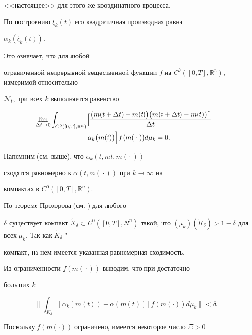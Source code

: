 <<настоящее>> для этого же координатного процесса.



По построению $\xi_k(t)$ его  квадратичная  производная  равна

$\alpha_k(\xi_k(t))$. 

Это означает,  что  для  любой 

ограниченной  непрерывной  вещественной  функции  $f$  на  $C^0([0,T],\mathbb{R}^n)$, измеримой  относительно 

$\mathcal{N}_t$,  при  всех  $k$  выполняется  равенство 

\begin{multline}

\lim\limits_{\Delta t\to 0}\int_{C^0([0,T],\mathbb{R}^n)}

\Bigl[{\frac{ \bigl(m(t+\Delta t)-m(t)\bigr) \bigl(m(t+\Delta t)-m(t)\bigr)^*}{\Delta t}}-

\\

-\alpha_k\bigl(m(t)\bigr)\Bigr]f\bigl(m({}\cdot{})\bigr)d\mu_k=0.

\end{multline}

Напомним (см. выше), что  $\alpha_k(t,mt,m({}\cdot{}))$ 

сходятся равномерно к $\alpha(t,m({}\cdot{}))$ при $k\to\infty$ на

компактах в $C^0([0,T],\mathbb{R}^n)$.



По теореме Прохорова (см. \cite{popovkoval:bib:B}) для любого

$\delta$ существует компакт $\tilde K_\delta\subset

C^0([0,T],\mathcal{R}^n)$ такой, что $(\mu_k)(\tilde

K_\delta)>1-\delta$ для всех $\mu_k$. Так как $\tilde K_\delta$ "---

компакт,  на нем имеется указанная равномерная сходимость.



Из ограниченности $f(m({}\cdot{}))$ выводим, что при достаточно

больших $k$

$$

       \|\int_{\tilde

       K_\delta}[\alpha_k(m(t))-\alpha(m(t))]f(m(\cdot))d\mu_k\|<\delta.

       $$

Поскольку $f(m(\cdot))$ ограничено, имеется некоторое число $\Xi>0$

